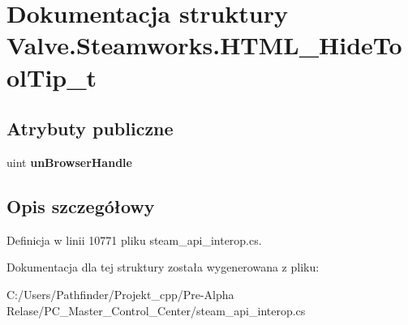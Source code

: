 \hypertarget{struct_valve_1_1_steamworks_1_1_h_t_m_l___hide_tool_tip__t}{}\section{Dokumentacja struktury Valve.\+Steamworks.\+H\+T\+M\+L\+\_\+\+Hide\+Tool\+Tip\+\_\+t}
\label{struct_valve_1_1_steamworks_1_1_h_t_m_l___hide_tool_tip__t}
\subsection*{Atrybuty publiczne}
\begin{DoxyCompactItemize}
\item 
\mbox{\label{struct_valve_1_1_steamworks_1_1_h_t_m_l___hide_tool_tip__t_ac83bde36fcfe681c52cc90f197ffc387}} 
uint {\bfseries un\+Browser\+Handle}
\end{DoxyCompactItemize}


\subsection{Opis szczegółowy}


Definicja w linii 10771 pliku steam\+\_\+api\+\_\+interop.\+cs.



Dokumentacja dla tej struktury została wygenerowana z pliku\+:\begin{DoxyCompactItemize}
\item 
C\+:/\+Users/\+Pathfinder/\+Projekt\+\_\+cpp/\+Pre-\/\+Alpha Relase/\+P\+C\+\_\+\+Master\+\_\+\+Control\+\_\+\+Center/steam\+\_\+api\+\_\+interop.\+cs\end{DoxyCompactItemize}
